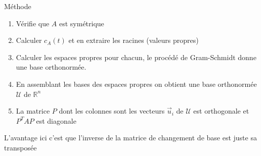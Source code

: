 \begin{parag}{Méthode}
\begin{enumerate}
    \item Vérifie que $A$ est symétrique
    \item Calculer $c_A(t)$ et en extraire les racines (valeurs propres)
    \item Calculer les espaces propres pour chacun, le procédé de Gram-Schmidt donne une base orthonormée.
    \item En assemblant les bases des espaces propres on obtient une base orthonormée $\mathcal{U}$ de $\mathbb{R}^n$
    \item La matrice $P$ dont les colonnes sont les vecteurs $\vec{u}_i$ de $\mathcal{U}$ est orthogonale et $P^TAP$ est diagonale
\end{enumerate}   
\begin{framedremark}
    L'avantage ici c'est que l'inverse de la matrice de changement de base est juste sa transposée
\end{framedremark}
\end{parag}
